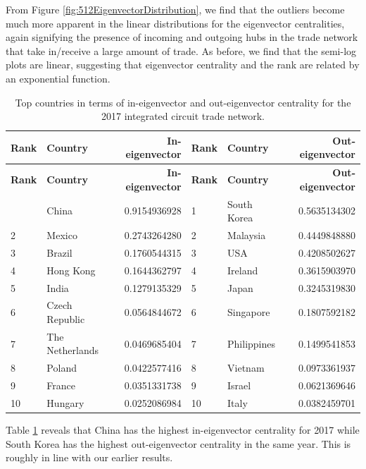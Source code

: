 \documentclass[12pt,letterpaper]{report}
\begin{document}
			From Figure \ref{fig:512EigenvectorDistribution}, we find that the outliers become much more apparent in the linear distributions for the eigenvector centralities, again signifying the presence of incoming and outgoing hubs in the trade network that take in/receive a large amount of trade. As before, we find that the semi-log plots are linear, suggesting that eigenvector centrality and the rank are related by an exponential function.
			
			\begin{longtable}{|l|l|r|l|l|r|}
				\caption{Top countries in terms of in-eigenvector and out-eigenvector centrality for the 2017 integrated circuit trade network. \label{tab:tab04TopEigenvector}} \\
				\hline
				\textbf{\small Rank} & \textbf{\small Country} & \textbf{\footnotesize In-eigenvector} & \textbf{\small Rank} &
				\textbf{\small Country} & \textbf{\footnotesize Out-eigenvector} \\
				\hline
				\endfirsthead
				\hline
				\textbf{\small Rank} & \textbf{\small Country} & \textbf{\footnotesize In-eigenvector} & \textbf{\small Rank} &
				\textbf{\small Country} & \textbf{\footnotesize Out-eigenvector} \\
				\hline
				\endhead
				\hline
				\endfoot
				1 & China & 0.9154936928 & 1 & South Korea & 0.5635134302 \\
				2 & Mexico & 0.2743264280 & 2 & Malaysia & 0.4449848880 \\
				3 & Brazil & 0.1760544315 & 3 & USA & 0.4208502627 \\
				4 & Hong Kong & 0.1644362797 & 4 & Ireland & 0.3615903970 \\
				5 & India & 0.1279135329 & 5 & Japan & 0.3245319830 \\
				6 & Czech Republic & 0.0564844672 & 6 & Singapore & 0.1807592182 \\
				7 & The Netherlands & 0.0469685404 & 7 & Philippines & 0.1499541853 \\
				8 & Poland & 0.0422577416 & 8 & Vietnam & 0.0973361937 \\
				9 & France & 0.0351331738 & 9 & Israel & 0.0621369646 \\
				10 & Hungary & 0.0252086984 & 10 & Italy & 0.0382459701 \\
			\end{longtable}
			
			Table \ref{tab:tab04TopEigenvector} reveals that China has the highest in-eigenvector centrality for 2017 while South Korea has the highest out-eigenvector centrality in the same year. This is roughly in line with our earlier results.
			
\end{document}
